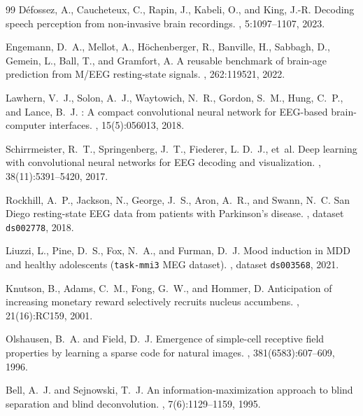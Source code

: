 \documentclass[11pt]{article}
\begin{document}
\begin{thebibliography}{99}
D\'efossez, A., Caucheteux, C., Rapin, J., Kabeli, O., and King, J.-R.
\newblock Decoding speech perception from non-invasive brain recordings.
, 5:1097--1107, 2023.

Engemann, D.~A., Mellot, A., H\"ochenberger, R., Banville, H., Sabbagh, D.,
Gemein, L., Ball, T., and Gramfort, A.
\newblock A reusable benchmark of brain-age prediction from {M/EEG}
resting-state signals.
, 262:119521, 2022.

Lawhern, V.~J., Solon, A.~J., Waytowich, N.~R., Gordon, S.~M., Hung, C.~P.,
and Lance, B.~J.
: A compact convolutional neural network for {EEG}-based
brain-computer interfaces.
, 15(5):056013, 2018.

Schirrmeister, R.~T., Springenberg, J.~T., Fiederer, L. D.~J., et~al.
\newblock Deep learning with convolutional neural networks for {EEG}
decoding and visualization.
, 38(11):5391--5420, 2017.


Rockhill, A.~P., Jackson, N., George, J.~S., Aron, A.~R., and Swann, N.~C.
 San Diego resting-state {EEG} data from patients with
{Parkinson}'s disease.
, dataset \texttt{ds002778}, 2018.

Liuzzi, L., Pine, D.~S., Fox, N.~A., and Furman, D.~J.
\newblock Mood induction in {MDD} and healthy adolescents
(\texttt{task-mmi3} {MEG} dataset).
, dataset \texttt{ds003568}, 2021.

Knutson, B., Adams, C.~M., Fong, G.~W., and Hommer, D.
\newblock Anticipation of increasing monetary reward selectively recruits
nucleus accumbens.
, 21(16):RC159, 2001.


Olshausen, B.~A. and Field, D.~J.
\newblock Emergence of simple-cell receptive field properties by learning a
sparse code for natural images.
, 381(6583):607--609, 1996.

Bell, A.~J. and Sejnowski, T.~J.
\newblock An information-maximization approach to blind separation and blind
deconvolution.
, 7(6):1129--1159, 1995.


\end{thebibliography}
\end{document}
